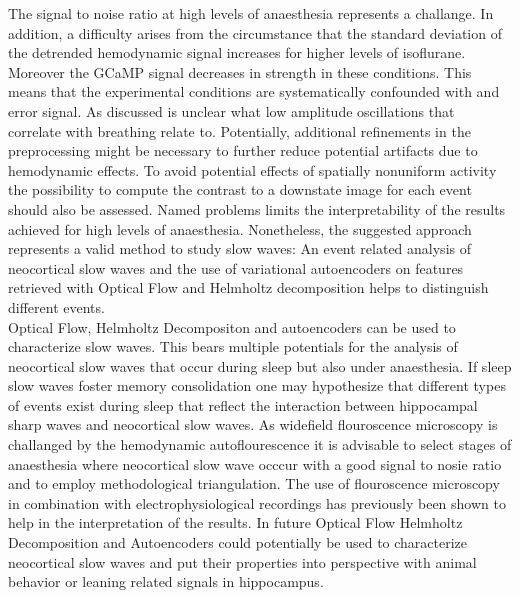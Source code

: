 The signal to noise ratio at high levels of anaesthesia represents a challange. In addition, a difficulty arises from the circumstance that the standard deviation of the detrended hemodynamic signal increases for higher levels of isoflurane. Moreover the GCaMP signal decreases in strength in these conditions. This means that the experimental conditions are systematically confounded with and error signal. As discussed is unclear what low amplitude oscillations that correlate with breathing relate to. Potentially, additional refinements in the preprocessing might be necessary to further reduce potential artifacts due to hemodynamic effects. To avoid potential effects of spatially nonuniform activity the possibility to compute the contrast to a downstate image for each event should also be assessed. Named problems limits the interpretability of the results achieved for high levels of anaesthesia. Nonetheless, the suggested approach represents a valid method to study slow waves: An event related analysis of neocortical slow waves and the use of variational autoencoders on features retrieved with Optical Flow and Helmholtz decomposition helps to distinguish different events.\\
Optical Flow, Helmholtz Decompositon and autoencoders can be used to characterize slow waves. This bears multiple potentials for the analysis of neocortical slow waves that occur during sleep but also under anaesthesia. If sleep slow waves foster memory consolidation one may hypothesize that different types of events exist during sleep that reflect the interaction between hippocampal sharp waves and neocortical slow waves. As widefield flouroscence microscopy is challanged by the hemodynamic autoflourescence it is advisable to select stages of anaesthesia where neocortical slow wave occcur with a good signal to nosie ratio and to employ methodological triangulation. The use of flouroscence microscopy in combination with electrophysiological recordings has previously been shown to help in the interpretation of the results. In future Optical Flow Helmholtz Decomposition and Autoencoders could potentially be used to characterize neocortical slow waves and put their properties into perspective with animal behavior or leaning related signals in hippocampus. 
